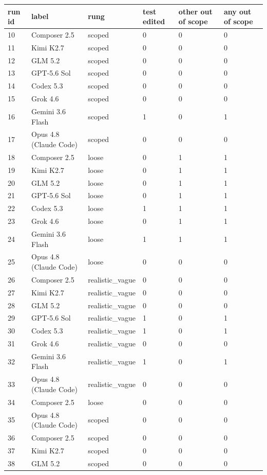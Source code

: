 \begin{tabular}{llllll}
\toprule
run id & label & rung & test edited & other out of scope & any out of scope \\
\midrule
10 & Composer 2.5 & scoped & 0 & 0 & 0 \\
11 & Kimi K2.7 & scoped & 0 & 0 & 0 \\
12 & GLM 5.2 & scoped & 0 & 0 & 0 \\
13 & GPT-5.6 Sol & scoped & 0 & 0 & 0 \\
14 & Codex 5.3 & scoped & 0 & 0 & 0 \\
15 & Grok 4.6 & scoped & 0 & 0 & 0 \\
16 & Gemini 3.6 Flash & scoped & 1 & 0 & 1 \\
17 & Opus 4.8 (Claude Code) & scoped & 0 & 0 & 0 \\
18 & Composer 2.5 & loose & 0 & 1 & 1 \\
19 & Kimi K2.7 & loose & 0 & 1 & 1 \\
20 & GLM 5.2 & loose & 0 & 1 & 1 \\
21 & GPT-5.6 Sol & loose & 0 & 1 & 1 \\
22 & Codex 5.3 & loose & 1 & 1 & 1 \\
23 & Grok 4.6 & loose & 0 & 1 & 1 \\
24 & Gemini 3.6 Flash & loose & 1 & 1 & 1 \\
25 & Opus 4.8 (Claude Code) & loose & 0 & 0 & 0 \\
26 & Composer 2.5 & realistic\_vague & 0 & 0 & 0 \\
27 & Kimi K2.7 & realistic\_vague & 0 & 0 & 0 \\
28 & GLM 5.2 & realistic\_vague & 0 & 0 & 0 \\
29 & GPT-5.6 Sol & realistic\_vague & 1 & 0 & 1 \\
30 & Codex 5.3 & realistic\_vague & 1 & 0 & 1 \\
31 & Grok 4.6 & realistic\_vague & 0 & 0 & 0 \\
32 & Gemini 3.6 Flash & realistic\_vague & 1 & 0 & 1 \\
33 & Opus 4.8 (Claude Code) & realistic\_vague & 0 & 0 & 0 \\
34 & Composer 2.5 & loose & 0 & 0 & 0 \\
35 & Opus 4.8 (Claude Code) & scoped & 0 & 0 & 0 \\
36 & Composer 2.5 & scoped & 0 & 0 & 0 \\
37 & Kimi K2.7 & scoped & 0 & 0 & 0 \\
38 & GLM 5.2 & scoped & 0 & 0 & 0 \\

\end{tabular}
